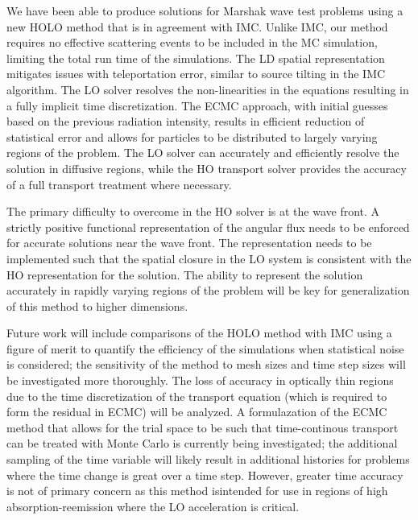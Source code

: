 \documentclass{mc2013}
\begin{document}


We have been able to produce solutions for Marshak wave test problems using
a new HOLO method that is in agreement with IMC.  Unlike IMC, our method requires no effective scattering
events to be included in the MC simulation, limiting the total run time of the
simulations.  The LD spatial representation
mitigates issues with teleportation error, similar to source tilting in the IMC
algorithm.   The LO solver resolves the non-linearities in the equations resulting in a fully
implicit time discretization.  The ECMC approach, with initial guesses based on the
previous radiation intensity, results in efficient reduction of statistical error and
allows for particles to be distributed to largely varying regions of the problem.
The LO solver
can accurately and efficiently resolve the solution in diffusive regions, while the HO
transport solver provides the accuracy of a full transport treatment where necessary. 

The primary difficulty to overcome in the HO
solver is at the wave front.  A strictly positive functional representation of the angular flux
needs to be enforced for accurate solutions near the wave front.  The representation needs to be implemented
such that the spatial closure in the LO system is consistent with the HO
representation for the solution.  The ability to represent the solution accurately in
rapidly varying regions of the problem will be key for generalization of this method
to higher dimensions.  


Future work will include comparisons of the HOLO method with IMC using a figure of
merit to quantify the efficiency of the simulations when statistical noise is
considered; the sensitivity of the method to mesh sizes and time step sizes will be
investigated more thoroughly.  The loss of accuracy in optically thin regions due to the time discretization of
the transport equation (which is required to form the residual in ECMC) will be
analyzed.  A formulazation of the ECMC method that allows for the trial space to be such that time-continous transport can
be treated with Monte Carlo is currently being investigated; the additional sampling
of the time variable will likely result in additional histories for problems where
the time change is great over a time step.  However, greater time accuracy is not of primary concern as this method isintended for use in
regions of high absorption-reemission where the LO acceleration is critical.
\end{document}
